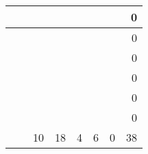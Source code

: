 \begin{table}[htbp]
\begin{tabular}{|l|l|r|r|r|r|r|r|}
    \hline
    \multicolumn{1}{l|}{} &       &       &       &       &       &       & \multicolumn{1}{r}{0} \bigstrut\\
    \hline
    \multicolumn{1}{l|}{} &       &       &       &       &       &       & \multicolumn{1}{r}{0} \bigstrut\\
    \hline
    \multicolumn{1}{l|}{} &       &       &       &       &       &       & \multicolumn{1}{r}{0} \bigstrut\\
    \hline
    \multicolumn{1}{l|}{} &       &       &       &       &       &       & \multicolumn{1}{r}{0} \bigstrut\\
    \hline
    \multicolumn{1}{l|}{} &       &       &       &       &       &       & \multicolumn{1}{r}{0} \bigstrut\\
    \hline
    \multicolumn{1}{l|}{} &       &       &       &       &       &       & \multicolumn{1}{r}{0} \bigstrut\\
    \hline
    \multicolumn{1}{l|}{} &       & 10    & 18    & 4     & 6     & 0     & \multicolumn{1}{r}{38} \bigstrut\\
    \hline
    \end{tabular}%
  \label{tab:addlabel}%
\end{table}%
